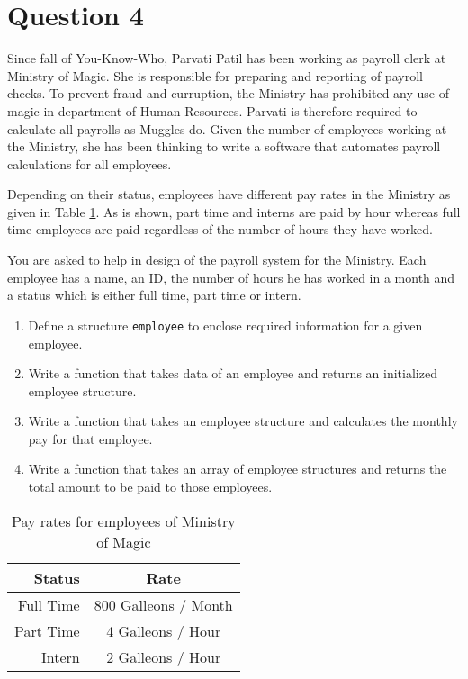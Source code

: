 \documentclass[12pt,letterpaper,twoside]{article}
\begin{document}
\newpage

\section*{Question 4}

Since fall of You-Know-Who, Parvati Patil has been working as payroll clerk at Ministry of Magic.
She is responsible for preparing and reporting of payroll checks.
To prevent fraud and curruption, the Ministry has prohibited any use of magic in department of Human Resources.
Parvati is therefore required to calculate all payrolls as Muggles do.
Given the number of employees working at the Ministry, she has been thinking to write a software that automates payroll calculations for all employees.

Depending on their status, employees have different pay rates in the Ministry as given in Table \ref{tablequestion5}.
As is shown, part time and interns are paid by hour whereas full time employees are paid regardless of the number of hours they have worked.

You are asked to help in design of the payroll system for the Ministry.
Each employee has a name, an ID, the number of hours he has worked in a month and a status which is either full time, part time or intern.

\begin{enumerate}
\item Define a structure \texttt{employee} to enclose required information for a given employee.
\item Write a function that takes data of an employee and returns an initialized employee structure.
\item Write a function that takes an employee structure and calculates the monthly pay for that employee.
\item Write a function that takes an array of employee structures and returns the total amount to be paid to those employees.
\end{enumerate}

\begin{table}[H] \centering
\begin{tabular}{r c}
\textbf{Status} & \textbf{Rate}\\
\hline
Full Time & 800 Galleons / Month\\
Part Time & 4 Galleons / Hour\\
Intern & 2 Galleons / Hour
\end{tabular}
\caption{Pay rates for employees of Ministry of Magic}
\label{tablequestion5}
\end{table}
\end{document}
